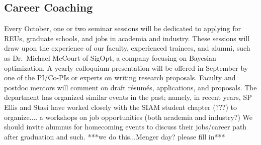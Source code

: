 \documentclass[11pt]{NSFamsart}
\newcommand{\FredNote}[1]{{\color{blue} Fred: #1}}
\begin{document}



\subsection*{Career Coaching}
Every October, one or two seminar sessions will be dedicated to applying for REUs, graduate schools, and jobs in academia and industry. These sessions will draw upon the experience of our faculty, experienced trainees, and alumni, such as Dr.\ Michael McCourt of SigOpt, a company focusing on Bayesian optimization.  A yearly colloquium presentation  will be offered in September by one of the PI/Co-PIs or experts on writing research proposals. Faculty and postdoc mentors will comment on draft r\'esum\'es,  applications, and proposals.  
The department has organized similar events in the past; namely, 
in recent years, SP Ellis and Stasi have worked closely with the SIAM student chapter (???) to organize.... a workshops on job opportunities (both academia and industry?)
We should invite alumnus for homecoming events to discuss their jobs/career path after graduation and such. {\color{red}***we do this...Menger day? please fill in***}






\end{document}
